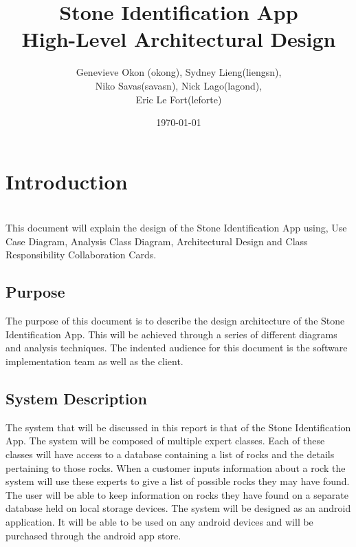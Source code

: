 \documentclass[titlepage]{article}
\title{Stone Identification App \\
	High-Level Architectural Design}
\author{Genevieve Okon (okong), Sydney Lieng(liengsn),\\
	Niko Savas(savasn), Nick Lago(lagond),\\
	Eric Le Fort(leforte)}
\date{\today}
\begin{document}
\maketitle
\newpage
\tableofcontents
\newpage

\section{Introduction}~\\
This document will explain the design of the Stone Identification App using, Use Case Diagram, Analysis Class Diagram, Architectural Design and Class Responsibility Collaboration Cards. 

\subsection{Purpose}
The purpose of this document is to describe the design architecture of the Stone Identification App. This will be achieved through a series of different diagrams and analysis techniques. The indented audience for this document is the software implementation team as well as the client.

\subsection{System Description}
The system that will be discussed in this report is that of the Stone Identification App. The system will be composed of multiple expert classes. Each of these classes will have access to a database containing a list of rocks and the details pertaining to those rocks. When a customer inputs information about a rock the system will use these experts to give a list of possible rocks they may have found. The user will be able to keep information on rocks they have found on a separate database held on local storage devices. The system will be designed as an android application. It will be able to be used on any android devices and will be purchased through the android app store. 
\end{document}
